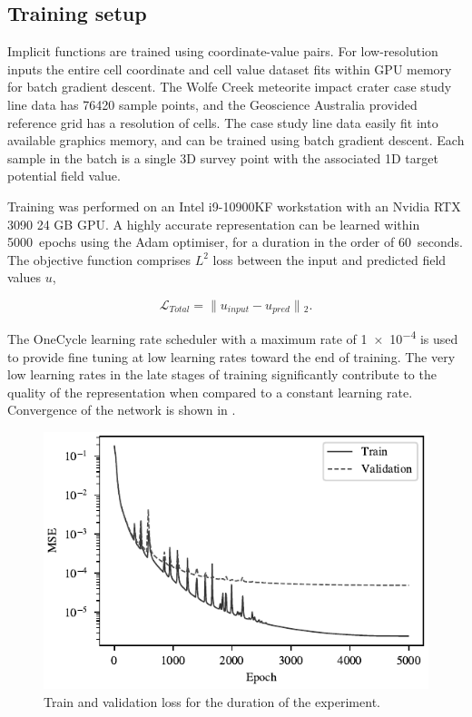 \subsection{Training setup}
\label{sec:training}

Implicit functions are trained using coordinate-value pairs.
For low-resolution inputs the entire cell coordinate and cell value dataset fits within GPU memory for batch gradient descent.
The Wolfe Creek meteorite impact crater case study line data has \num{76420} sample points, and the Geoscience Australia provided reference grid has a resolution of  cells.
The case study line data easily fit into available graphics memory, and can be trained using batch gradient descent.
Each sample in the batch is a single 3D survey point with the associated 1D target potential field value.

Training was performed on an Intel i9-10900KF workstation with an Nvidia RTX 3090 24 GB GPU\@.
A highly accurate representation can be learned within \qty{5000}{epochs} using the Adam optimiser, for a duration in the order of \qty{60}{seconds}.
The objective function comprises \(L^2\) loss between the input and predicted field values \(u\),

\begin{equation}
    \label{eqn:cri}
    \mathcal{L}_{Total} = \lVert{}u_{input} - u_{pred}\rVert{}_{2}. %
\end{equation}

The OneCycle learning rate scheduler \parencite{smithSuperconvergenceVeryFast2018} with a maximum rate of \num{1e-4} is used to provide fine tuning at low learning rates toward the end of training.
The very low learning rates in the late stages of training significantly contribute to the quality of the representation when compared to a constant learning rate.
Convergence of the network is shown in .


\begin{figure}[hbt]
    \centering
    \includegraphics[width=0.5\linewidth]{fig/p3/loss_plot.pdf}
    \caption[Training convergence]{Train and validation loss for the duration of the experiment.}
    \label{fig:convergence}
\end{figure}


